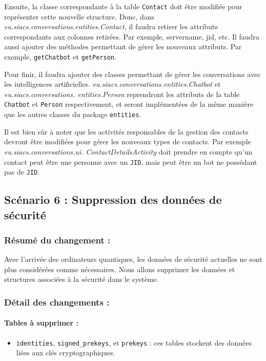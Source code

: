 \documentclass[a4paper,11pt]{article}
\begin{document}
Ensuite, la classe correspondante à la table \texttt{Contact} doit être modifiée pour représenter cette nouvelle structure. Donc, dans \textit{eu.siacs.conversations.entities.Contact}, il faudra retirer les attributs correspondants aux colonnes retirées. Par exemple, servername, jid, etc. Il faudra aussi ajouter des méthodes permettant de gérer les nouveaux attributs. Par exemple, \texttt{getChatbot} et \texttt{getPerson}.

Pour finir, il faudra ajouter des classes permettant de gérer les conversations avec les intelligences artificielles. \textit{eu.siacs.conversations.entities.Chatbot} et \textit{eu.siacs.conversations. entities.Person} reprendront les attributs de la table \texttt{Chatbot} et \texttt{Person} respectivement, et seront implémentées de la même manière que les autres classes du package \texttt{entities}.

Il est bien sûr à noter que les activités responsables de la gestion des contacts devront  être modifiées pour gérer les nouveaux types de contacts. Par exemple \textit{eu.siacs.conversations.ui.
ContactDetailsActivity} doit prendre en compte qu'un contact peut être une personne avec un \texttt{JID}, mais peut être un bot ne possédant pas de \texttt{JID}. 


\subsection*{Scénario 6 : Suppression des données de sécurité}

\subsubsection*{Résumé du changement :}
Avec l'arrivée des ordinateurs quantiques, les données de sécurité actuelles ne sont plus considérées comme nécessaires. Nous allons supprimer les données et structures associées à la sécurité dans le système.

\subsubsection*{Détail des changements :}

\paragraph{Tables à supprimer :}
\begin{itemize}
    \item \texttt{identities}, \texttt{signed\_prekeys}, et \texttt{prekeys} : ces tables stockent des données liées aux clés cryptographiques.
\end{itemize}
\end{document}
